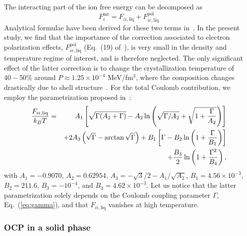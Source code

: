 The interacting part of the ion free energy can be decomposed
as~\cite{Fantina2020}
%
\begin{equation}
  F_i^{\text{int}} = F_{ii,\text{liq}} +
  F_{ie,\text{liq}}^{\text{pol}}\label{eq:fiintliq}
\end{equation}
%
Analytical formulae have been derived for these two terms 
in~\cite{Potekhin2000}.
In the present study, we find that the importance of the correction
associated to electron polarization effects, 
$F_{ie,\text{liq}}^{\text{pol}}$ (Eq.~(19) of~\cite{Potekhin2000}), is very 
small in the density and temperature regime of interest, and is therefore 
neglected. The only significant effect of the latter correction is to change 
the crystallization temperature of $40-50\%$ around $P\approx 1.25\times 
10^{-4}$ MeV/fm$^3$, where the composition changes drastically due to 
shell structure~\cite{Fantina2020}.
For the total Coulomb contribution, we employ the parametrization 
proposed in~\cite{Potekhin2000}: 
%
\begin{eqnarray}
  \frac{F_{ii,\text{liq}}}{k_B T} 
  &=& A_1\left[\sqrt{\Gamma(A_2+\Gamma)} - A_2\ln\left(\sqrt{\Gamma/A_2} 
+ \sqrt{1+\frac{\Gamma}{A_2}}\right)\right]\notag\\
  &&+ 2A_3\left(\sqrt{\Gamma} - \arctan\sqrt{\Gamma}\right) 
  + B_1\left[\Gamma-B_2\ln\left(1+\frac{\Gamma}{B_1}\right)\right]\notag\\
  &&+ \frac{B_3}{2}\ln\left(1+\frac{\Gamma^2}{B_4}\right),
\end{eqnarray}
%
with $A_1=-0.9070$, $A_2=0.62954$, $A_3=-\sqrt{3}/2-A_1/\sqrt{A_2}$,
$B_1=4.56\times 10^{-3}$, $B_2=211.6$, $B_3=-10^{-4}$, and $B_4=4.62\times
10^{-3}$. Let us notice that the latter parametrization 
solely depends on the Coulomb coupling parameter $\Gamma$, 
Eq.~(\ref{eq:gamma}), and that $F_{ii,\text{liq}}$ vanishes at high 
temperature.

\subsubsection{OCP in a solid phase}

